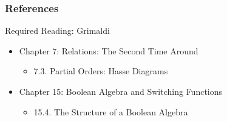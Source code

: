 \documentclass[dvipsnames]{beamer}
\begin{document}
\begin{frame}
  \frametitle{References}

  \begin{block}{Required Reading: Grimaldi}
    \begin{itemize}
      \item Chapter 7: Relations: The Second Time Around
      \begin{itemize}
        \item 7.3. \alert{Partial Orders: Hasse Diagrams}
      \end{itemize}

      \item Chapter 15: Boolean Algebra and Switching Functions
      \begin{itemize}
        \item 15.4. \alert{The Structure of a Boolean Algebra}
      \end{itemize}
    \end{itemize}
  \end{block}
\end{frame}
\end{document}
